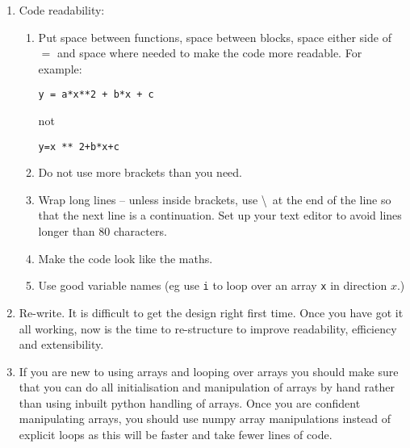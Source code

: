 \begin{enumerate}
\item Code readability:
    \begin{enumerate}
    \item Put space between functions, space between blocks, space either side of $=$ and space where needed to make the code more readable. For example:\\
    \begin{minipage}[t]{0.35\linewidth}\centerline{
        \tt y = a*x**2 + b*x + c
    }\end{minipage}
    \begin{minipage}[t]{0.25\linewidth}\centerline{
        not
    }\end{minipage}
    \begin{minipage}[t]{0.35\linewidth}\centerline{
        \tt y=x ** 2+b*x+c
    }\end{minipage}
    
    \item Do not use more brackets than you need.

    \item Wrap long lines -- unless inside brackets, use \textbackslash\ at the end of the line so that the next line is a continuation. Set up your text editor to avoid lines longer than 80 characters.
    
    \item Make the code look like the maths.
    
    \item Use good variable names (eg use {\tt i} to loop over an array {\tt x} in direction $x$.)

    \end{enumerate}
    
    \item Re-write. It is difficult to get the design right first time. Once you have got it all working, now is the time to re-structure to improve readability, efficiency and extensibility. 
    
    \item If you are new to using arrays and looping over arrays you should make sure that you can do all initialisation and manipulation of arrays by hand rather than using inbuilt python handling of arrays. Once you are confident manipulating arrays, you should use numpy array manipulations instead of explicit loops as this will be faster and take fewer lines of code.
\end{enumerate}


